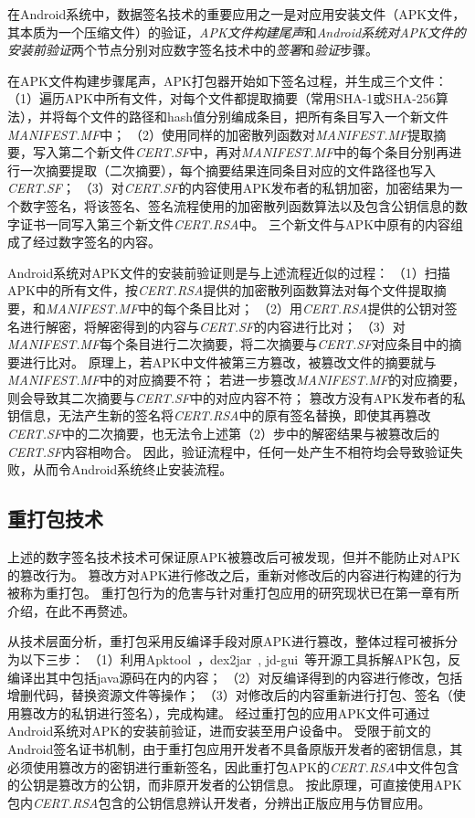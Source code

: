 在Android系统中，数据签名技术的重要应用之一是对应用安装文件（APK文件，其本质为一个压缩文件）的验证，\textit{APK文件构建尾声}和\textit{Android系统对APK文件的安装前验证}两个节点分别对应数字签名技术中的\textit{签署}和\textit{验证}步骤。

在APK文件构建步骤尾声，APK打包器开始如下签名过程，并生成三个文件：
（1）遍历APK中所有文件，对每个文件都提取摘要（常用SHA-1或SHA-256算法），并将每个文件的路径和hash值分别编成条目，把所有条目写入一个新文件\textit{MANIFEST.MF}中；
（2）使用同样的加密散列函数对\textit{MANIFEST.MF}提取摘要，写入第二个新文件\textit{CERT.SF}中，再对\textit{MANIFEST.MF}中的每个条目分别再进行一次摘要提取（二次摘要），每个摘要结果连同条目对应的文件路径也写入\textit{CERT.SF}；
（3）对\textit{CERT.SF}的内容使用APK发布者的私钥加密，加密结果为一个数字签名，将该签名、签名流程使用的加密散列函数算法以及包含公钥信息的数字证书一同写入第三个新文件\textit{CERT.RSA}中。
三个新文件与APK中原有的内容组成了经过数字签名的内容。

Android系统对APK文件的安装前验证则是与上述流程近似的过程：
（1）扫描APK中的所有文件，按\textit{CERT.RSA}提供的加密散列函数算法对每个文件提取摘要，和\textit{MANIFEST.MF}中的每个条目比对；
（2）用\textit{CERT.RSA}提供的公钥对签名进行解密，将解密得到的内容与\textit{CERT.SF}的内容进行比对；
（3）对\textit{MANIFEST.MF}每个条目进行二次摘要，将二次摘要与\textit{CERT.SF}对应条目中的摘要进行比对。
原理上，若APK中文件被第三方篡改，被篡改文件的摘要就与\textit{MANIFEST.MF}中的对应摘要不符；
若进一步篡改\textit{MANIFEST.MF}的对应摘要，则会导致其二次摘要与\textit{CERT.SF}中的对应内容不符；
篡改方没有APK发布者的私钥信息，无法产生新的签名将\textit{CERT.RSA}中的原有签名替换，即使其再篡改\textit{CERT.SF}中的二次摘要，也无法令上述第（2）步中的解密结果与被篡改后的\textit{CERT.SF}内容相吻合。
因此，验证流程中，任何一处产生不相符均会导致验证失败，从而令Android系统终止安装流程。

\subsection{重打包技术}
\label{sec:repackaging}

上述的数字签名技术技术可保证原APK被篡改后可被发现，但并不能防止对APK的篡改行为。
篡改方对APK进行修改之后，重新对修改后的内容进行构建的行为被称为重打包。
重打包行为的危害与针对重打包应用的研究现状已在第一章有所介绍，在此不再赘述。

从技术层面分析，重打包采用反编译手段对原APK进行篡改，整体过程可被拆分为以下三步：
（1）利用Apktool~\cite{apktool}，dex2jar~\cite{dex2jar}, jd-gui~\cite{jd-gui}等开源工具拆解APK包，反编译出其中包括java源码在内的内容；
（2）对反编译得到的内容进行修改，包括增删代码，替换资源文件等操作；
（3）对修改后的内容重新进行打包、签名（使用篡改方的私钥进行签名），完成构建。
经过重打包的应用APK文件可通过Android系统对APK的安装前验证，进而安装至用户设备中。
受限于前文的Android签名证书机制，由于重打包应用开发者不具备原版开发者的密钥信息，其必须使用篡改方的密钥进行重新签名，因此重打包APK的\textit{CERT.RSA}中文件包含的公钥是篡改方的公钥，而非原开发者的公钥信息。
按此原理，可直接使用APK包内\textit{CERT.RSA}包含的公钥信息辨认开发者，分辨出正版应用与仿冒应用。


